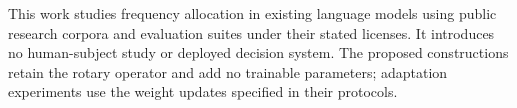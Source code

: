This work studies frequency allocation in existing language models using public research corpora and evaluation suites under their stated licenses. It introduces no human-subject study or deployed decision system. The proposed constructions retain the rotary operator and add no trainable parameters; adaptation experiments use the weight updates specified in their protocols.
